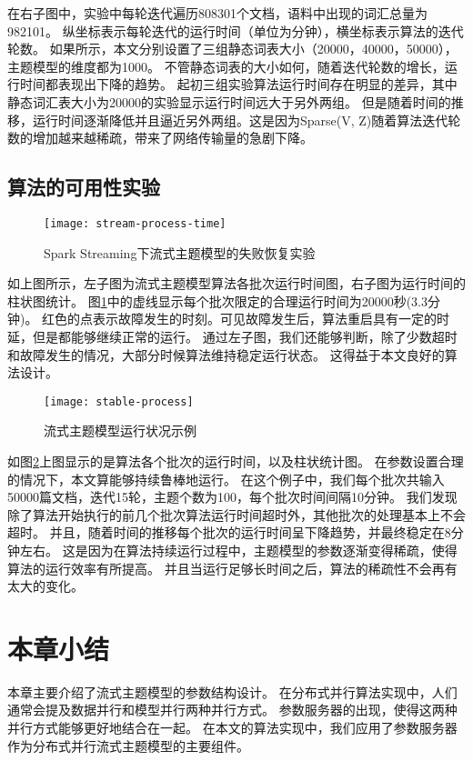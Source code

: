 在右子图中，实验中每轮迭代遍历808301个文档，语料中出现的词汇总量为982101。
纵坐标表示每轮迭代的运行时间（单位为分钟），横坐标表示算法的迭代轮数。
如果所示，本文分别设置了三组静态词表大小（20000，40000，50000），主题模型的维度都为1000。
不管静态词表的大小如何，随着迭代轮数的增长，运行时间都表现出下降的趋势。
起初三组实验算法运行时间存在明显的差异，其中静态词汇表大小为20000的实验显示运行时间远大于另外两组。
但是随着时间的推移，运行时间逐渐降低并且逼近另外两组。这是因为Sparse(V, Z)随着算法迭代轮数的增加越来越稀疏，带来了网络传输量的急剧下降。

\subsection{算法的可用性实验}
\begin{figure}[htb]\centering
\texttt{[image: stream-process-time]}
\caption{Spark Streaming下流式主题模型的失败恢复实验}
\label{fig:stream-process-time}       %
\end{figure}
如上图所示，左子图为流式主题模型算法各批次运行时间图，右子图为运行时间的柱状图统计。
图\ref{fig:stream-process-time}中的虚线显示每个批次限定的合理运行时间为20000秒(3.3分钟)。
红色的点表示故障发生的时刻。可见故障发生后，算法重启具有一定的时延，但是都能够继续正常的运行。
通过左子图，我们还能够判断，除了少数超时和故障发生的情况，大部分时候算法维持稳定运行状态。
这得益于本文良好的算法设计。

\begin{figure}[htb]\centering
\texttt{[image: stable-process]}
\caption{流式主题模型运行状况示例}
\label{fig:stable-process}       %
\end{figure}

如图\ref{fig:stable-process}上图显示的是算法各个批次的运行时间，以及柱状统计图。
在参数设置合理的情况下，本文算能够持续鲁棒地运行。
在这个例子中，我们每个批次共输入50000篇文档，迭代15轮，主题个数为100，每个批次时间间隔10分钟。
我们发现除了算法开始执行的前几个批次算法运行时间超时外，其他批次的处理基本上不会超时。
并且，随着时间的推移每个批次的运行时间呈下降趋势，并最终稳定在8分钟左右。
这是因为在算法持续运行过程中，主题模型的参数逐渐变得稀疏，使得算法的运行效率有所提高。
并且当运行足够长时间之后，算法的稀疏性不会再有太大的变化。

\section{本章小结}
本章主要介绍了流式主题模型的参数结构设计。
在分布式并行算法实现中，人们通常会提及数据并行和模型并行两种并行方式。
参数服务器的出现，使得这两种并行方式能够更好地结合在一起。
在本文的算法实现中，我们应用了参数服务器作为分布式并行流式主题模型的主要组件。


